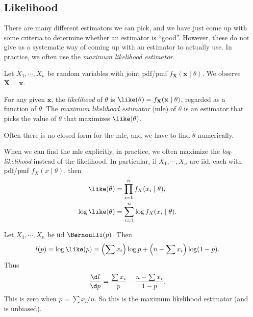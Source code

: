 \documentclass[a4paper]{article}
\begin{document}
\subsection{Likelihood}
There are many different estimators we can pick, and we have just come up with some criteria to determine whether an estimator is ``good''. However, these do not give us a systematic way of coming up with an estimator to actually use. In practice, we often use the \emph{maximum likelihood estimator}.

Let $X_1, \cdots , X_n$ be random variables with joint pdf/pmf $f_\mathbf{X}(\mathbf{x}\mid \theta)$. We observe $\mathbf{X} = \mathbf{x}$.

\begin{defi}[Likelihood]
  For any given $\mathbf{x}$, the \emph{likelihood} of $\theta$ is $\like(\theta) = f_\mathbf{X}(\mathbf{x} \mid \theta)$, regarded as a function of $\theta$. The \emph{maximum likelihood estimator} (mle) of $\theta$ is an estimator that picks the value of $\theta$ that maximizes $\like (\theta)$.
\end{defi}
Often there is no closed form for the mle, and we have to find $\hat{\theta}$ numerically.

When we can find the mle explicitly, in practice, we often maximize the \emph{log-likelihood} instead of the likelihood. In particular, if $X_1, \cdots, X_n$ are iid, each with pdf/pmf $f_X(x\mid \theta)$, then
\begin{align*}
  \like(\theta) &= \prod_{i = 1}^n f_X(x_i\mid \theta),\\
  \log\like (\theta) &= \sum_{i = 1}^n \log f_X(x_i\mid \theta).
\end{align*}

\begin{eg}
  Let $X_1, \cdots, X_n$ be iid $\Bernoulli(p)$. Then
  \[
    l(p) =\log\like(p) = \left(\sum x_i\right)\log p + \left(n - \sum x_i\right)\log(1 - p).
  \]
  Thus
  \[
    \frac{\d l}{\d p} = \frac{\sum x_i}{p} - \frac{n - \sum x_i}{1 - p}.
  \]
  This is zero when $p = \sum x_i /n$. So this is the maximum likelihood estimator (and is unbiased).
\end{eg}
\end{document}
